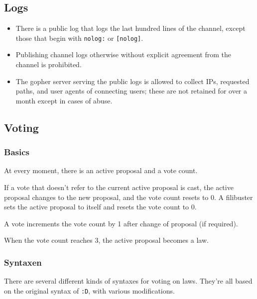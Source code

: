 \documentclass[11pt]{article}
\begin{document}
\subsection{Logs}

\begin{itemize}
\item There is a public log that logs the last hundred lines of the channel, except those that
begin with \texttt{nolog:} or \texttt{[nolog]}.
\item Publishing channel logs otherwise without explicit agreement from the channel is
prohibited.
\item The gopher server serving the public logs is allowed to collect IPs, requested paths,
and user agents of connecting users; these are not retained for over a month except in cases
of abuse.
\end{itemize}


\subsection{Voting}


\subsubsection{Basics}

At every moment, there is an active proposal and a vote count.

If a vote that doesn't refer to the current active proposal is cast, the active proposal
changes to the new proposal, and the vote count resets to 0. A filibuster sets the active
proposal to itself and resets the vote count to 0.

A vote increments the vote count by 1 after change of proposal (if required).

When the vote count reaches 3, the active proposal becomes a law.


\subsubsection{Syntaxen}
There are several different kinds of syntaxes for voting on laws. They're all based
on the original syntax of \texttt{:D}, with various modifications.
\end{document}
